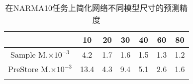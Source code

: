 \begin{center}
\begin{table}
	\caption{在NARMA10任务上简化网络不同模型尺寸的预测精度}
	\renewcommand\arraystretch{1.2}
	\setlength{\tabcolsep}{12pt}
	\begin{tabular}{ccccccc}
	\toprule
		 							&	10		&	20		&	30		&	40		&	60		&	80		\\	\midrule
	Sample M.\(\times 10^{-3}\)		&	4.2		&	1.7		&	1.6		&	1.5		&	1.3		&	1.2	 \\	\hline
	PreStore M.\(\times 10^{-3}\)	&	13.4	&	4.3		&	9.4		&	5.1		&	2.6		&	1.6	\\	
	\bottomrule
	\label{tab:narma10}
	\end{tabular}
\end{table}
\vspace{-3em}
\end{center}

